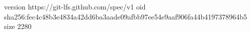 version https://git-lfs.github.com/spec/v1
oid sha256:fec4c48b3e4834a42dd6ba3aade09afbb97ee54e9aaf906fa44b4197378964b5
size 2280
